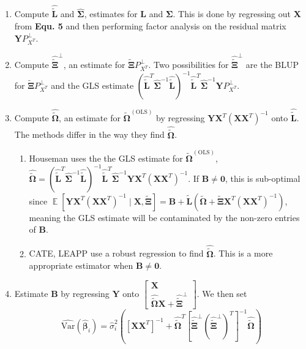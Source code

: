 \documentclass{article}
\DeclareMathOperator{\E}{\mathbb{E}}
\begin{document}
\begin{enumerate}
	\item Compute $\hat{\bm{\tilde{L}}}$ and $\hat{\bm{\Sigma}}$, estimates for $\bm{L}$ and $\bm{\Sigma}$. This is done by regressing out $\bm{X}$ from \textbf{Equ. 5} and then performing factor analysis on the residual matrix $\bm{Y}P_{X^T}^{\perp}$.
	\item Compute $\hat{\tilde{\bm{\Xi}}}^{\perp}$, an estimate for $\tilde{\bm{\Xi}} P_{X^T}^{\perp}$. Two possibilities for $\hat{\tilde{\bm{\Xi}}}^{\perp}$ are the BLUP for $\tilde{\bm{\Xi}} P_{X^T}^{\perp}$ and the GLS estimate $\left( \hat{\bm{\tilde{L}}}^T \hat{\bm{\Sigma}}^{-1}\hat{\bm{\tilde{L}}} \right)^{-1} \hat{\bm{\tilde{L}}}^T \hat{\bm{\Sigma}}^{-1} \bm{Y} P_{X^T}^{\perp}$.	
	\item Compute $\hat{\tilde{\bm{\Omega}}}$, an estimate for $\tilde{\bm{\Omega}}^{(\text{OLS})}$ by regressing $\bm{Y} \bm{X}^T \left( \bm{X}\bm{X}^T \right)^{-1}$ onto $\hat{\bm{\tilde{L}}}$. The methods differ in the way they find $\hat{\tilde{\bm{\Omega}}}$.
		\begin{enumerate}
		\item Houseman uses the the GLS estimate for $\tilde{\bm{\Omega}}^{(\text{OLS})}$, $\hat{\tilde{\bm{\Omega}}} = \left( \hat{\bm{\tilde{L}}}^T \hat{\bm{\Sigma}}^{-1}\hat{\bm{\tilde{L}}} \right)^{-1} \hat{\bm{\tilde{L}}}^T \hat{\bm{\Sigma}}^{-1} \bm{Y} \bm{X}^T \left( \bm{X}\bm{X}^T \right)^{-1}$. If $\bm{B} \neq \bm{0}$, this is sub-optimal since $\E\left[ \bm{Y}\bm{X}^T \left( \bm{X}\bm{X}^T \right)^{-1} \mid \bm{X}, \tilde{\bm{\Xi}} \right] = \bm{B} + \bm{\tilde{L}}\left( \tilde{\bm{\Omega}} + \tilde{\bm{\Xi}}\bm{X}^T \left( \bm{X}\bm{X}^T \right)^{-1}  \right)$, meaning the GLS estimate will be contaminated by the non-zero entries of $\bm{B}$.
		\item CATE, LEAPP use a robust regression to find $\hat{\tilde{\bm{\Omega}}}$. This is a more appropriate estimator when $\bm{B} \neq \bm{0}$. 
		\end{enumerate}
	\item Estimate $\bm{B}$ by regressing $\bm{Y}$ onto $\left[ \begin{matrix}
	\bm{X}\\
	\hat{\tilde{\bm{\Omega}}} \bm{X} + \hat{\tilde{\bm{\Xi}}}^{\perp}
\end{matrix} \right]$. We then set 
\begin{equation}
\hat{\text{Var}}\left( \hat{\bm{\beta}}_i \right) = \hat{\sigma}_i^2 \left( \left[ \bm{X}\bm{X}^T \right]^{-1} + \hat{\tilde{\bm{\Omega}}}^T\left[ \hat{\tilde{\bm{\Xi}}}^{\perp}\left( \hat{\tilde{\bm{\Xi}}}^{\perp} \right)^T \right]^{-1} \hat{\tilde{\bm{\Omega}}} \right)
\end{equation} 
\end{enumerate}
\end{document}
